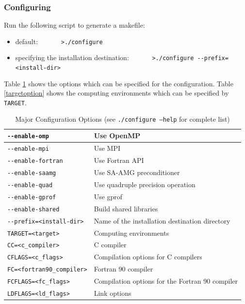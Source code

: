 \documentclass[a4paper]{article}
\begin{document}
 \subsubsection{Configuring}
Run the following script to generate a makefile:
 \begin{itemize}
\item default: \verb&      >./configure&
\item specifying the installation destination: \verb&      >./configure --prefix=<install-dir>&
\end{itemize}
Table \ref{configoption} shows the options which can be specified for
the configuration. 
Table \ref{targetoption} shows the computing environments which can be specified 
by \verb+TARGET+. 
\begin{table}[htbp]
\caption{Major Configuration Options (see {\tt ./configure --help} for complete list)}
\label{configoption}
\begin{center}
\begin{tabular}{|l|l|}
\hline
\verb+--enable-omp+      & Use OpenMP\\ \hline
\verb+--enable-mpi+      & Use MPI\\ \hline
\verb+--enable-fortran+  & Use Fortran API\\ \hline
\verb+--enable-saamg+    & Use SA-AMG preconditioner\\ \hline
\verb+--enable-quad+     & Use quadruple precision operation\\ \hline
\verb+--enable-gprof+    & Use gprof\\ \hline
\verb+--enable-shared+    & Build shared libraries\\ \hline
\verb+--prefix=<install-dir>+    & Name of the installation destination directory\\ \hline
\verb+TARGET=<target>+    & Computing environments\\ \hline
\verb+CC=<c_compiler>+    & C compiler\\ \hline
\verb+CFLAGS=<c_flags>+    & Compilation options for C compilers\\ \hline
\verb+FC=<fortran90_compiler>+    & Fortran 90 compiler\\ \hline
\verb+FCFLAGS=<fc_flags>+    & Compilation options for the Fortran 90 compiler\\ \hline
\verb+LDFLAGS=<ld_flags>+    & Link options\\ \hline
\end{tabular}
\end{center}
\end{table}
\end{document}

